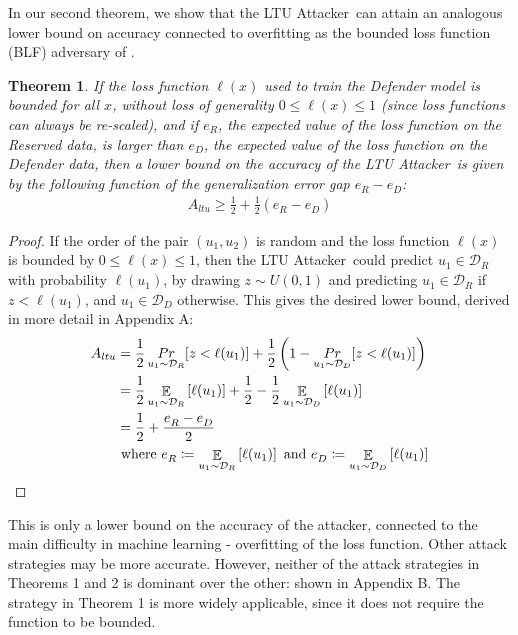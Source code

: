 \documentclass[letterpaper]{article}
\newcommand{\oracle}{LTU Attacker~}
\newtheorem{theorem}{Theorem}
\begin{document}
In our second theorem, we show that the \oracle can attain an analogous lower bound on accuracy connected to overfitting as the bounded loss function (BLF) adversary of \cite{yeom2018privacy}.
\begin{theorem}\label{thm:blf}
If the loss function $\ell(x)$ used to train the Defender model is bounded for all $x$, without loss of generality $0 \le \ell(x) \le 1$ (since loss functions can always be re-scaled), and if $e_R$, the expected value of the loss function on the Reserved data, is larger than $e_D$, the expected value of the loss function on the Defender data, then a lower bound on the accuracy of the \oracle is given by the following function of the generalization error gap $e^{}_R - e^{}_D$:
\begin{align}
A_{ltu} \ge \frac{1}{2} + \frac{1}{2} (e^{}_R - e^{}_D)
\end{align}
\end{theorem}

\begin{proof}
If the order of the pair $(u_1,u_2)$ is random and the loss function $\ell(x)$ is bounded by $0 \le \ell(x)\le 1$, then the \oracle could predict $u_1 \in \mathcal{D}_R$ with probability $\ell(u_1)$, by drawing $z \sim U(0,1)$ and predicting $u_1 \in \mathcal{D}_R$ if $z < \ell(u_1)$, and $u_1 \in \mathcal{D}_D$ otherwise. This gives the desired lower bound, derived in more detail in Appendix A:
\begin{align}
A_{ltu} &= \frac{1}{2}\mathop{Pr}_{u_1 \sim \mathcal{D}_R}[z<\ell(u_1)] + \frac{1}{2}\left( 1 - \mathop{Pr}_{u_1 \sim \mathcal{D}_D}[z<\ell(u_1)]\right) \notag \\
&= \frac{1}{2}\mathop{\mathbb{E}}_{u_1 \sim \mathcal{D}_R}\left[\ell(u_1)\right] + \frac{1}{2} - \frac{1}{2}\mathop{\mathbb{E}}_{u_1 \sim \mathcal{D}_D}\left[ \ell(u_1)\right] \notag \\
&= \frac{1}{2} + \frac{e^{}_R - e^{}_D}{2} \\
& \text{ where } e^{}_R \coloneqq \mathop{\mathbb{E}}_{u_1 \sim \mathcal{D}_R}\left[\ell(u_1)\right] \text{ and } e^{}_D \coloneqq \mathop{\mathbb{E}}_{u_1 \sim \mathcal{D}_D}\left[\ell(u_1)\right] \notag
\end{align}
\end{proof}

This is only a lower bound on the accuracy of the attacker, connected to the main difficulty in machine learning - overfitting of the loss function. Other attack strategies may be more accurate. However, neither of the attack strategies in Theorems 1 and 2 is dominant over the other: shown in Appendix B. The strategy in Theorem 1 is more widely applicable, since it does not require the function to be bounded.
\end{document}
